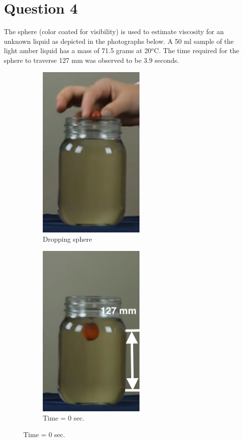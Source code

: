 \documentclass[12pt]{article}
\begin{document}
\section*{Question 4}
The sphere (color coated for visibility) is used to estimate viscosity for an unknown liquid as depicted in the photographs below. A 50 ml sample of the light amber liquid has a mass of 71.5 grams at 20$^o$C. The time required for the sphere to traverse 127 mm was observed to be 3.9 seconds.
\begin{figure}[h!]
\centering
\begin{subfigure}{.3\textwidth}
  \centering
  \includegraphics[width=.4\linewidth]{drop.png}
  \caption{Dropping sphere}
  \label{fig:sub1}
\end{subfigure}%
\begin{subfigure}{.3\textwidth}
  \centering
  \includegraphics[width=.4\linewidth]{begin.png}
  \caption{Time = 0 sec.}

\end{subfigure}
\end{figure}
\end{document}
